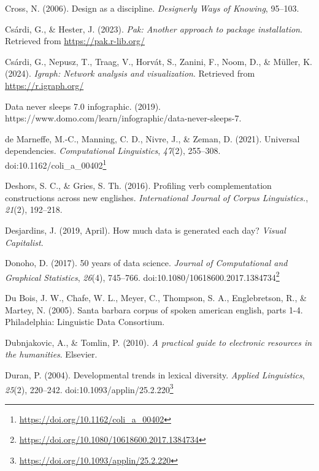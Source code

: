 \documentclass[
  letterpaper,
]{book}
\newlength{\cslhangindent}
\newenvironment{CSLReferences}[2] %
 {\begin{list}{}{%
  \setlength{\itemindent}{0pt}
  \setlength{\leftmargin}{0pt}
  \setlength{\parsep}{0pt}
  \ifodd #1
   \setlength{\leftmargin}{\cslhangindent}
   \setlength{\itemindent}{-1\cslhangindent}
  \fi
  \setlength{\itemsep}{#2\baselineskip}}}
 {\end{list}}
\theoremstyle{definition}
\theoremstyle{remark}
\DeclareRobustCommand{\href}[2]{#2\footnote{\url{#1}}}
\begin{document}
\begin{CSLReferences}{1}{0}
Cross, N. (2006). Design as a discipline. \emph{Designerly Ways of
Knowing}, 95--103.

Csárdi, G., \& Hester, J. (2023). \emph{Pak: Another approach to package
installation}. Retrieved from \url{https://pak.r-lib.org/}

Csárdi, G., Nepusz, T., Traag, V., Horvát, S., Zanini, F., Noom, D., \&
Müller, K. (2024). \emph{Igraph: Network analysis and visualization}.
Retrieved from \url{https://r.igraph.org/}

Data never sleeps 7.0 infographic. (2019).
https://www.domo.com/learn/infographic/data-never-sleeps-7.

de Marneffe, M.-C., Manning, C. D., Nivre, J., \& Zeman, D. (2021).
Universal dependencies. \emph{Computational Linguistics}, \emph{47}(2),
255--308.
doi:\href{https://doi.org/10.1162/coli_a_00402}{10.1162/coli\_a\_00402}

Deshors, S. C., \& Gries, S. Th. (2016). Profiling verb complementation
constructions across new englishes. \emph{International Journal of
Corpus Linguistics.}, \emph{21}(2), 192--218.

Desjardins, J. (2019, April). How much data is generated each day?
\emph{Visual Capitalist}.

Donoho, D. (2017). 50 years of data science. \emph{Journal of
Computational and Graphical Statistics}, \emph{26}(4), 745--766.
doi:\href{https://doi.org/10.1080/10618600.2017.1384734}{10.1080/10618600.2017.1384734}

Du Bois, J. W., Chafe, W. L., Meyer, C., Thompson, S. A., Englebretson,
R., \& Martey, N. (2005). Santa barbara corpus of spoken american
english, parts 1-4. Philadelphia: Linguistic Data Consortium.

Dubnjakovic, A., \& Tomlin, P. (2010). \emph{A practical guide to
electronic resources in the humanities}. Elsevier.

Duran, P. (2004). Developmental trends in lexical diversity.
\emph{Applied Linguistics}, \emph{25}(2), 220--242.
doi:\href{https://doi.org/10.1093/applin/25.2.220}{10.1093/applin/25.2.220}


\end{CSLReferences}
\end{document}
